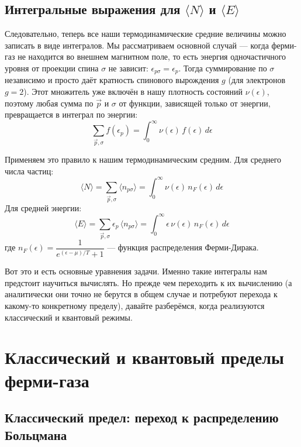 \documentclass[../general/general]{subfiles}
\begin{document}
\subsection{Интегральные выражения для $\langle N \rangle$ и $\langle E \rangle$}

Следовательно, теперь все наши термодинамические средние величины можно записать в виде интегралов. Мы рассматриваем основной случай — когда ферми-газ не находится во внешнем магнитном поле, то есть энергия одночастичного уровня от проекции спина $\sigma$ не зависит: $\epsilon_{p\sigma} = \epsilon_p$. Тогда суммирование по $\sigma$ независимо и просто даёт кратность спинового вырождения $g$ (для электронов $g = 2$). Этот множитель уже включён в нашу плотность состояний $\nu(\epsilon)$, поэтому любая сумма по $\vec{p}$ и $\sigma$ от функции, зависящей только от энергии, превращается в интеграл по энергии:
\begin{equation}
    \sum_{\vec{p}, \sigma} f(\epsilon_p) = \int_0^\infty \nu(\epsilon)\, f(\epsilon)\, d\epsilon
\end{equation}

Применяем это правило к нашим термодинамическим средним. Для среднего числа частиц:
\begin{equation}
    \langle N \rangle = \sum_{\vec{p}, \sigma} \langle n_{p\sigma} \rangle = \int_0^\infty \nu(\epsilon)\, n_F(\epsilon)\, d\epsilon
\end{equation}
Для средней энергии:
\begin{equation}
    \langle E \rangle = \sum_{\vec{p}, \sigma} \epsilon_p\, \langle n_{p\sigma} \rangle = \int_0^\infty \epsilon\, \nu(\epsilon)\, n_F(\epsilon)\, d\epsilon
\end{equation}
где $n_F(\epsilon) = \dfrac{1}{e^{(\epsilon - \mu)/T} + 1}$ — функция распределения Ферми-Дирака.

Вот это и есть основные уравнения задачи. Именно такие интегралы нам предстоит научиться вычислять. Но прежде чем переходить к их вычислению (а аналитически они точно не берутся в общем случае и потребуют перехода к какому-то конкретному пределу), давайте разберёмся, когда реализуются классический и квантовый режимы.


\section{Классический и квантовый пределы ферми-газа}

\subsection{Классический предел: переход к распределению Больцмана}
\end{document}
